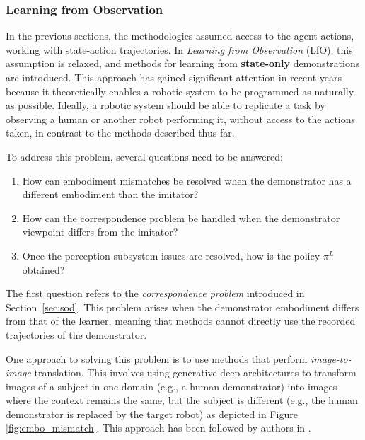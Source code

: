 \subsubsection{Learning from Observation}


\label{sec:lfo}
In the previous sections, the methodologies assumed access to the agent actions, working with state-action trajectories. In \textit{Learning from Observation} (LfO), this assumption is relaxed, and methods for learning from \textbf{state-only} demonstrations are introduced. This approach has gained significant attention in recent years~\cite{torabi2019recent_advances_lfo} because it theoretically enables a robotic system to be programmed as naturally as possible. Ideally, a robotic system should be able to replicate a task by observing a human or another robot performing it, without access to the actions taken, in contrast to the methods described thus far.

To address this problem, several questions need to be answered:

\begin{enumerate}
\item How can embodiment mismatches be resolved when the demonstrator has a different embodiment than the imitator?
\item How can the correspondence problem be handled when the demonstrator viewpoint differs from the imitator?
\item Once the perception subsystem issues are resolved, how is the policy $\pi^{L}$ obtained?
\end{enumerate}

The first question refers to the \textit{correspondence problem} introduced in Section~\ref{sec:sod}. This problem arises when the demonstrator embodiment differs from that of the learner, meaning that methods cannot directly use the recorded trajectories of the demonstrator.

One approach to solving this problem is to use methods that perform \textit{image-to-image} translation. This involves using generative deep architectures to transform images of a subject in one domain (e.g., a human demonstrator) into images where the context remains the same, but the subject is different (e.g., the human demonstrator is replaced by the target robot) as depicted in Figure \ref{fig:embo_mismatch}. This approach has been followed by authors in \cite{smith2019avid,xiong2021learning_by_watching,li2021meta_watching_video_demonstration}.

